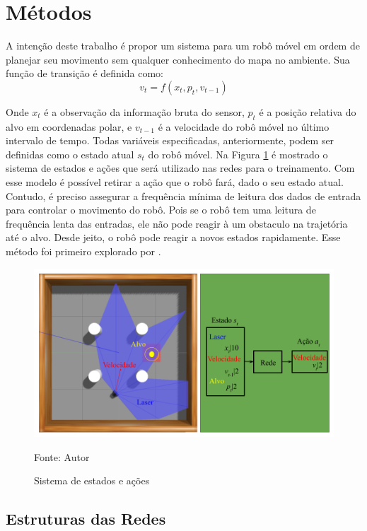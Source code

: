 \section{Métodos}

A intenção deste trabalho é propor um sistema para um robô móvel em ordem de planejar seu movimento sem qualquer conhecimento do mapa no ambiente. Sua função de transição é definida como:
\begin{equation}
    v_t = f(x_t, p_t, v_{t-1})
\end{equation}

Onde $x_t$ é a observação da informação bruta do sensor, $p_t$ é a posição relativa do alvo em coordenadas polar, e $v_{t-1}$ é a velocidade do robô móvel no último intervalo de tempo.
Todas variáveis especificadas, anteriormente, podem ser definidas como o estado atual $s_t$ do robô móvel.
Na Figura \ref{fig:state_action} é mostrado o sistema de estados e ações que será utilizado nas redes para o treinamento.
Com esse modelo é possível retirar a ação que o robô fará, dado o seu estado atual.
Contudo, é preciso assegurar a frequência mínima de leitura dos dados de entrada para controlar o movimento do robô.
Pois se o robô tem uma leitura de frequência lenta das entradas, ele não pode reagir à um obstaculo na trajetória até o alvo.
Desde jeito, o robô pode reagir a novos estados rapidamente.
Esse método foi primeiro explorado por \cite{tai2017virtual}.

\vspace{0.25cm}
\begin{figure}[H]
\caption{Sistema de estados e ações}
\centerline{\includegraphics[width=\columnwidth]{imagens/state_action.png}}
\small{Fonte: Autor}
\label{fig:state_action}
\end{figure}

\subsection{Estruturas das Redes}

